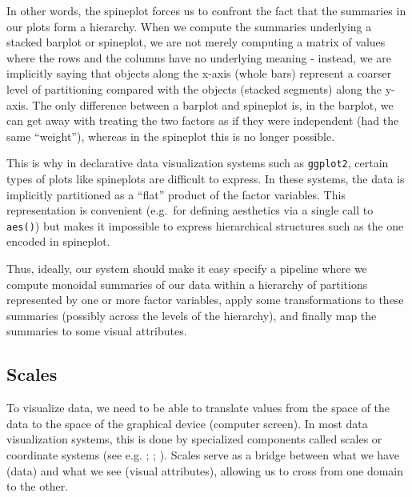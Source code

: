 \documentclass[
]{book}
\theoremstyle{definition}
\theoremstyle{definition}
\theoremstyle{definition}
\theoremstyle{definition}
\theoremstyle{remark}
\begin{document}
In other words, the spineplot forces us to confront the fact that the summaries in our plots form a hierarchy. When we compute the summaries underlying a stacked barplot or spineplot, we are not merely computing a matrix of values where the rows and the columns have no underlying meaning - instead, we are implicitly saying that objects along the x-axis (whole bars) represent a coarser level of partitioning compared with the objects (stacked segments) along the y-axis. The only difference between a barplot and spineplot is, in the barplot, we can get away with treating the two factors as if they were independent (had the same ``weight''), whereas in the spineplot this is no longer possible.

This is why in declarative data visualization systems such as \texttt{ggplot2}, certain types of plots like spineplots are difficult to express. In these systems, the data is implicitly partitioned as a ``flat'' product of the factor variables. This representation is convenient (e.g.~for defining aesthetics via a single call to \texttt{aes()}) but makes it impossible to express hierarchical structures such as the one encoded in spineplot.

Thus, ideally, our system should make it easy specify a pipeline where we compute monoidal summaries of our data within a hierarchy of partitions represented by one or more factor variables, apply some transformations to these summaries (possibly across the levels of the hierarchy), and finally map the summaries to some visual attributes.

\subsection{Scales}\label{scales}

To visualize data, we need to be able to translate values from the space of the data to the space of the graphical device (computer screen). In most data visualization systems, this is done by specialized components called scales or coordinate systems (see e.g. ; ; ). Scales serve as a bridge between what we have (data) and what we see (visual attributes), allowing us to cross from one domain to the other.
\end{document}

